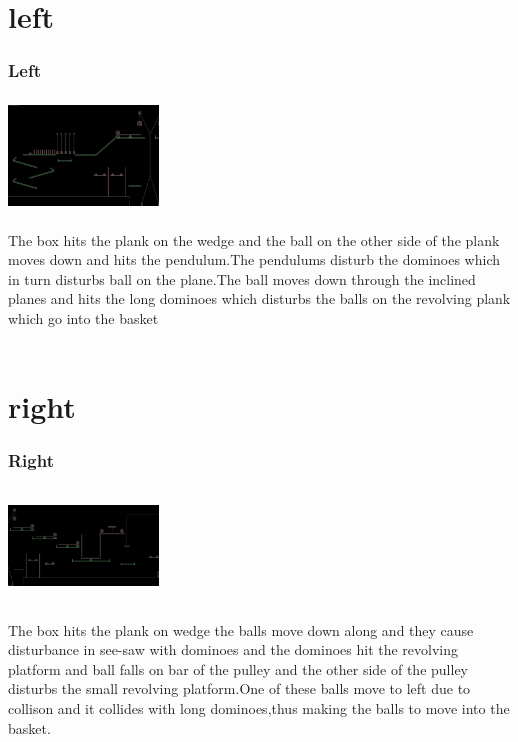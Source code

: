 \documentclass[t,compress,11pt,xcolor=dvipsnames]{beamer}
\begin{document}
\section{left}
\begin{frame}
\frametitle{Left}
\begin{center}
\includegraphics[width=4cm,height=3cm]{left1}
\end{center}
The box hits the plank on the wedge and the ball on the other side of the plank moves down and hits the pendulum.The pendulums disturb the dominoes which in turn disturbs ball on the plane.The ball moves down through the inclined planes and hits the long dominoes which 
disturbs the balls on the revolving plank which go into the basket  \\~\\
\end{frame}
\section{right}
\begin{frame}
\frametitle{Right}
\begin{center}
\includegraphics[width=4cm,height=3.0cm]{right1}
\end{center}
The box hits the plank on wedge the balls move down along and they cause disturbance in see-saw with dominoes and the dominoes hit the revolving platform and ball falls on bar of the pulley and the other side of the pulley disturbs the small revolving platform.One of these balls move to left due to collison and it collides with long dominoes,thus making the balls to move into the basket.
\end{frame}
\end{document}
